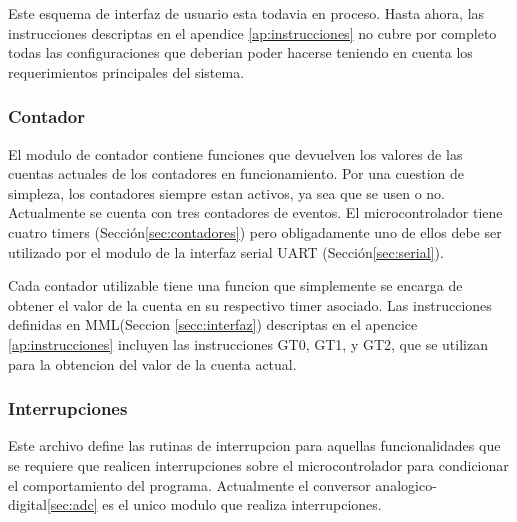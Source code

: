 Este esquema de interfaz de usuario esta todavia en proceso. Hasta ahora, las instrucciones descriptas en el apendice \ref{ap:instrucciones} no cubre por completo todas las configuraciones que deberian poder hacerse teniendo en cuenta los requerimientos principales del sistema.


\subsubsection{Contador}
El modulo de contador contiene funciones que devuelven los valores de las cuentas actuales de los contadores en funcionamiento. Por una cuestion de simpleza, los contadores siempre estan activos, ya sea que se usen o no. Actualmente se cuenta con tres contadores de eventos. El microcontrolador tiene cuatro timers (Secci\'on\ref{sec:contadores}) pero obligadamente uno de ellos debe ser utilizado por el modulo de la interfaz serial UART (Secci\'on\ref{sec:serial}).

Cada contador utilizable tiene una funcion que simplemente se encarga de obtener el valor de la cuenta en su respectivo timer asociado. Las instrucciones definidas en MML(Seccion \ref{secc:interfaz}) descriptas en el apencice \ref{ap:instrucciones} incluyen las instrucciones GT0, GT1, y GT2, que se utilizan para la obtencion del valor de la cuenta actual.
\subsubsection{Interrupciones}
Este archivo define las rutinas de interrupcion para aquellas funcionalidades que se requiere que realicen interrupciones sobre el microcontrolador para condicionar el comportamiento del programa. Actualmente el conversor analogico-digital\ref{sec:adc} es el unico modulo que realiza interrupciones.


\clearpage